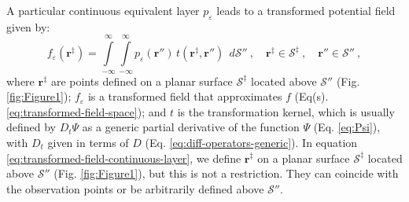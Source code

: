 A particular continuous equivalent layer 
$p_{\varepsilon}$ leads to a transformed potential field given by:
\begin{equation}
	f_{\varepsilon}(\mathbf{r}^{\ddagger})
	= \int\limits_{-\infty}^{\infty}\int\limits_{-\infty}^{\infty}
	p_{\varepsilon}(\mathbf{r}'') \, t(\mathbf{r}^{\ddagger}, \mathbf{r}'') \:\: d\mathcal{S}'' \: , 
	\quad \mathbf{r}^{\ddagger} \in \mathcal{S}^{\ddagger} \: ,
	\quad \mathbf{r}'' \in \mathcal{S}'' \: ,
	\label{eq:transformed-field-continuous-layer}
\end{equation}
where $\mathbf{r}^{\ddagger}$ are points defined on a planar surface $\mathcal{S}^{\ddagger}$ located above 
$\mathcal{S}''$ (Fig. \ref{fig:Figure1}); 
$f_{\varepsilon}$ is a transformed field that approximates $f$ (Eq(s). \ref{eq:transformed-field-space}); and
$t$ is the transformation kernel, which is usually defined by $D_{t} \Psi$ as a generic partial 
derivative of the function $\Psi$ (Eq. \ref{eq:Psi}), with $D_{t}$ given in terms of 
$D$ (Eq. \ref{eq:diff-operators-generic}).
In equation \ref{eq:transformed-field-continuous-layer}, we define $\mathbf{r}^{\ddagger}$ on 
a planar surface $\mathcal{S}^{\ddagger}$ located above $\mathcal{S}''$ (Fig. \ref{fig:Figure1}), but this is not a 
restriction. They can coincide with the observation points or be arbitrarily defined above $\mathcal{S}''$.
